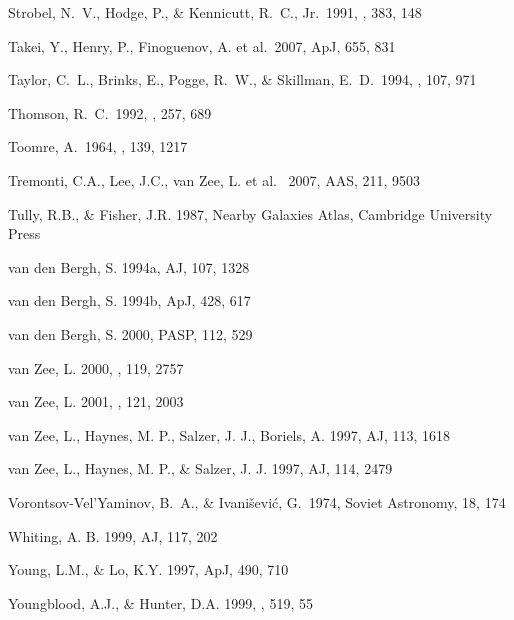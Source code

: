 \documentclass[preprint]{aastex}
\begin{document}
\begin{thebibliography}{}
Strobel, N.~V., Hodge, P., \& Kennicutt, R.~C., Jr.\ 1991, \apj, 383, 148 

Takei, Y., Henry, P., Finoguenov, A. et al.\ 2007, ApJ, 655, 831 

Taylor, C.~L., Brinks, E., Pogge, R.~W., \& Skillman, E.~D.\ 1994, \aj, 107, 971 

Thomson, R.~C.\ 1992, \mnras, 257, 689 

Toomre, A.\ 1964, \apj, 139, 1217 

Tremonti, C.A., Lee, J.C., van Zee, L. et al. \ 2007, AAS, 211, 9503

Tully, R.B., \& Fisher, J.R. 1987, Nearby Galaxies Atlas, Cambridge
University Press
 
van den Bergh, S. 1994a, AJ, 107, 1328

van den Bergh, S. 1994b, ApJ, 428, 617

van den Bergh, S. 2000, PASP, 112, 529

van Zee, L. 2000, \aj , 119, 2757

van Zee, L. 2001, \aj , 121, 2003

van Zee, L., Haynes, M. P., Salzer, J. J., Boriels, A. 1997, AJ, 113, 1618

van Zee, L., Haynes, M. P., \& Salzer, J. J. 1997, AJ, 114, 2479

Vorontsov-Vel'Yaminov, B.~A., \& 
Ivani{\v s}evi{\'c}, G.\ 1974, Soviet Astronomy, 18, 174 

Whiting, A. B. 1999, AJ, 117, 202

Young, L.M., \& Lo, K.Y. 1997, ApJ, 490, 710
 
Youngblood, A.J., \& Hunter, D.A. 1999, \apj , 519, 55

\end{thebibliography}{}


\clearpage
\end{document}
